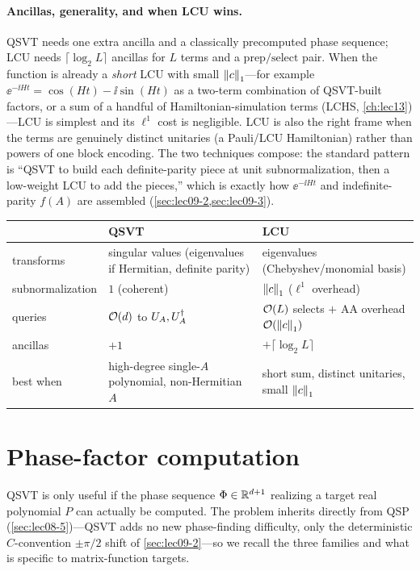 \paragraph{Ancillas, generality, and when LCU wins.} QSVT needs one extra ancilla and a
classically precomputed phase sequence; LCU needs $\lceil\log_2 L\rceil$ ancillas for
$L$ terms and a $\mathrm{prep}/\mathrm{select}$ pair. When the function is already a
\emph{short} LCU with small $\left\lVert c \right\rVert_1$---for example $\ee^{-\ii Ht}=\cos(Ht)-\ii
\sin(Ht)$ as a two-term combination of QSVT-built factors, or a sum of a handful of
Hamiltonian-simulation terms (LCHS, \cref{ch:lec13})---LCU is simplest and its
$\ell^1$ cost is negligible. LCU is also the right frame when the terms are genuinely
distinct unitaries (a Pauli/LCU Hamiltonian) rather than powers of one block encoding.
The two techniques compose: the standard pattern is ``QSVT to build each definite-parity
piece at unit subnormalization, then a low-weight LCU to add the pieces,'' which is
exactly how $\ee^{-\ii Ht}$ and indefinite-parity $f(A)$ are assembled
(\cref{sec:lec09-2,sec:lec09-3}).

\begin{center}
\renewcommand{\arraystretch}{1.25}
\begin{tabular}{@{}p{}p{}p{}@{}}
\hline
 & \textbf{QSVT} & \textbf{LCU}\\
\hline
transforms & singular values (eigenvalues if Hermitian, definite parity) & eigenvalues
  (Chebyshev/monomial basis)\\
subnormalization & $1$ (coherent) & $\left\lVert c \right\rVert_1$ ($\ell^1$ overhead)\\
queries & $\mathcal{O}(d)$ to $U_A,U_A^{\dagger}$ & $\mathcal{O}(L)$ selects $+$ AA overhead
  $\mathcal{O}(\left\lVert c \right\rVert_1)$\\
ancillas & $+1$ & $+\lceil\log_2 L\rceil$\\
best when & high-degree single-$A$ polynomial, non-Hermitian $A$ & short sum, distinct
  unitaries, small $\left\lVert c \right\rVert_1$\\
\hline
\end{tabular}
\end{center}

\section{Phase-factor computation}
\label{sec:lec09-5}

QSVT is only useful if the phase sequence $\Phi\in\mathbb{R}^{d+1}$ realizing a target real
polynomial $P$ can actually be computed. The problem inherits directly from QSP
(\cref{sec:lec08-5})---QSVT adds no new phase-finding difficulty, only the deterministic
$C$-convention $\pm\pi/2$ shift of \cref{sec:lec09-2}---so we recall the three families
and what is specific to matrix-function targets.

